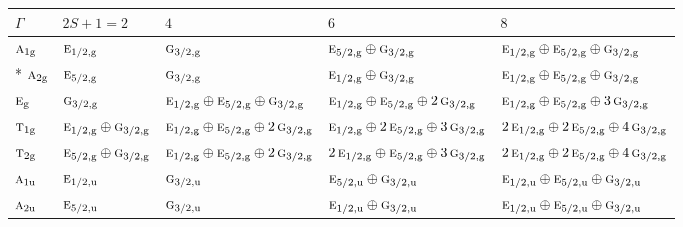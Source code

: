 \documentclass[10pt,a4paper]{article}
\numberwithin{equation}{section}
\newcommand{\irr}[1]{\text{\normalfont\scshape #1}}
\newcommand{\ptag}[1]{\mathrm{#1}}
\begin{document}
{\small\setlength{\tabcolsep}{3pt}\begin{longtable}{@{}l>{\RaggedRight\arraybackslash}p{}>{\RaggedRight\arraybackslash}p{}>{\RaggedRight\arraybackslash}p{}>{\RaggedRight\arraybackslash}p{}@{}}\toprule
$\Gamma$ & $2S + 1 = 2$ & $4$ & $6$ & $8$\\\midrule\endhead
\bottomrule\endfoot\endlastfoot
$\irr{a}_{1\ptag{g}}$ & $\irr{e}_{1/2,\ptag{g}}$ & $\irr{g}_{3/2,\ptag{g}}$ & $\irr{e}_{5/2,\ptag{g}}\oplus \irr{g}_{3/2,\ptag{g}}$ & $\irr{e}_{1/2,\ptag{g}}\oplus \irr{e}_{5/2,\ptag{g}}\oplus \irr{g}_{3/2,\ptag{g}}$\\*
$\irr{a}_{2\ptag{g}}$ & $\irr{e}_{5/2,\ptag{g}}$ & $\irr{g}_{3/2,\ptag{g}}$ & $\irr{e}_{1/2,\ptag{g}}\oplus \irr{g}_{3/2,\ptag{g}}$ & $\irr{e}_{1/2,\ptag{g}}\oplus \irr{e}_{5/2,\ptag{g}}\oplus \irr{g}_{3/2,\ptag{g}}$\\
$\irr{e}_{\ptag{g}}$ & $\irr{g}_{3/2,\ptag{g}}$ & $\irr{e}_{1/2,\ptag{g}}\oplus \irr{e}_{5/2,\ptag{g}}\oplus \irr{g}_{3/2,\ptag{g}}$ & $\irr{e}_{1/2,\ptag{g}}\oplus \irr{e}_{5/2,\ptag{g}}\oplus 2\,\irr{g}_{3/2,\ptag{g}}$ & $\irr{e}_{1/2,\ptag{g}}\oplus \irr{e}_{5/2,\ptag{g}}\oplus 3\,\irr{g}_{3/2,\ptag{g}}$\\
$\irr{t}_{1\ptag{g}}$ & $\irr{e}_{1/2,\ptag{g}}\oplus \irr{g}_{3/2,\ptag{g}}$ & $\irr{e}_{1/2,\ptag{g}}\oplus \irr{e}_{5/2,\ptag{g}}\oplus 2\,\irr{g}_{3/2,\ptag{g}}$ & $\irr{e}_{1/2,\ptag{g}}\oplus 2\,\irr{e}_{5/2,\ptag{g}}\oplus 3\,\irr{g}_{3/2,\ptag{g}}$ & $2\,\irr{e}_{1/2,\ptag{g}}\oplus 2\,\irr{e}_{5/2,\ptag{g}}\oplus 4\,\irr{g}_{3/2,\ptag{g}}$\\
$\irr{t}_{2\ptag{g}}$ & $\irr{e}_{5/2,\ptag{g}}\oplus \irr{g}_{3/2,\ptag{g}}$ & $\irr{e}_{1/2,\ptag{g}}\oplus \irr{e}_{5/2,\ptag{g}}\oplus 2\,\irr{g}_{3/2,\ptag{g}}$ & $2\,\irr{e}_{1/2,\ptag{g}}\oplus \irr{e}_{5/2,\ptag{g}}\oplus 3\,\irr{g}_{3/2,\ptag{g}}$ & $2\,\irr{e}_{1/2,\ptag{g}}\oplus 2\,\irr{e}_{5/2,\ptag{g}}\oplus 4\,\irr{g}_{3/2,\ptag{g}}$\\
$\irr{a}_{1\ptag{u}}$ & $\irr{e}_{1/2,\ptag{u}}$ & $\irr{g}_{3/2,\ptag{u}}$ & $\irr{e}_{5/2,\ptag{u}}\oplus \irr{g}_{3/2,\ptag{u}}$ & $\irr{e}_{1/2,\ptag{u}}\oplus \irr{e}_{5/2,\ptag{u}}\oplus \irr{g}_{3/2,\ptag{u}}$\\
$\irr{a}_{2\ptag{u}}$ & $\irr{e}_{5/2,\ptag{u}}$ & $\irr{g}_{3/2,\ptag{u}}$ & $\irr{e}_{1/2,\ptag{u}}\oplus \irr{g}_{3/2,\ptag{u}}$ & $\irr{e}_{1/2,\ptag{u}}\oplus \irr{e}_{5/2,\ptag{u}}\oplus \irr{g}_{3/2,\ptag{u}}$\\

\end{longtable}}
\end{document}
